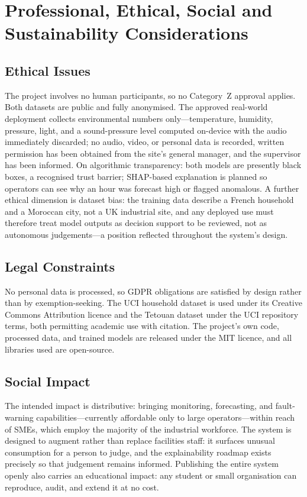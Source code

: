 \documentclass[11pt,a4paper]{article}
\begin{document}
\section{Professional, Ethical, Social and Sustainability Considerations}

\subsection{Ethical Issues}
The project involves no human participants, so no Category~Z approval applies.
Both datasets are public and fully anonymised. The approved real-world
deployment collects environmental numbers only---temperature, humidity,
pressure, light, and a sound-pressure level computed on-device with the audio
immediately discarded; no audio, video, or personal data is recorded, written
permission has been obtained from the site's general manager, and the supervisor
has been informed. On algorithmic transparency: both models are presently black
boxes, a recognised trust barrier; SHAP-based explanation
\cite{lundberg2017unified} is planned so operators can see why an hour was
forecast high or flagged anomalous. A further ethical dimension is dataset bias:
the training data describe a French household and a Moroccan city, not a UK
industrial site, and any deployed use must therefore treat model outputs as
decision support to be reviewed, not as autonomous judgements---a position
reflected throughout the system's design.

\subsection{Legal Constraints}
No personal data is processed, so GDPR obligations are satisfied by design
rather than by exemption-seeking. The UCI household dataset
\cite{hebrail2012individual} is used under its Creative Commons Attribution
licence and the Tetouan dataset \cite{salam2018comparison} under the UCI repository terms, both permitting
academic use with citation. The project's own code, processed data, and trained
models are released under the MIT licence, and all libraries used are
open-source.

\subsection{Social Impact}
The intended impact is distributive: bringing monitoring, forecasting, and
fault-warning capabilities---currently affordable only to large
operators---within reach of SMEs, which employ the majority of the industrial
workforce. The system is designed to augment rather than replace facilities
staff: it surfaces unusual consumption for a person to judge, and the
explainability roadmap exists precisely so that judgement remains informed.
Publishing the entire system openly also carries an educational impact: any
student or small organisation can reproduce, audit, and extend it at no cost.
\end{document}

